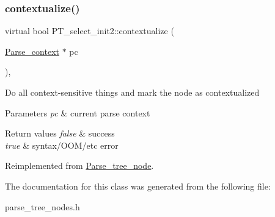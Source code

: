 \subsubsection{\texorpdfstring{contextualize()}{contextualize()}}
{\footnotesize\ttfamily virtual bool P\+T\+\_\+select\+\_\+init2\+::contextualize (\begin{DoxyParamCaption}\item[{\mbox{\hyperlink{structParse__context}{Parse\+\_\+context}} $\ast$}]{pc }\end{DoxyParamCaption})\hspace{0.3cm}{\ttfamily [inline]}, {\ttfamily [virtual]}}

Do all context-\/sensitive things and mark the node as contextualized


\begin{DoxyParams}{Parameters}
{\em pc} & current parse context\\
\hline
\end{DoxyParams}

\begin{DoxyRetVals}{Return values}
{\em false} & success \\
\hline
{\em true} & syntax/\+O\+O\+M/etc error \\
\hline
\end{DoxyRetVals}


Reimplemented from \mbox{\hyperlink{classParse__tree__node_a22d93524a537d0df652d7efa144f23da}{Parse\+\_\+tree\+\_\+node}}.



The documentation for this class was generated from the following file\+:\begin{DoxyCompactItemize}
\item 
parse\+\_\+tree\+\_\+nodes.\+h\end{DoxyCompactItemize}
